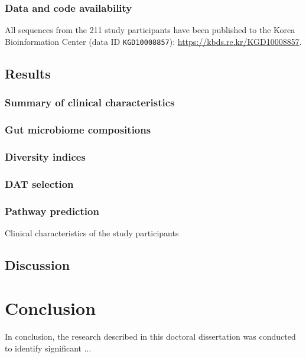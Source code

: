\documentclass[11pt, a4paper, onecolumn, oneside]{report}
\begin{document}
            \subsubsection{Data and code availability}
                All sequences from the 211 study participants have been published to the Korea Bioinformation Center (data ID \texttt{KGD10008857}): \url{https://kbds.re.kr/KGD10008857}.
        \clearpage

        \subsection{Results}
            \subsubsection{Summary of clinical characteristics}
            \subsubsection{Gut microbiome compositions}
            \subsubsection{Diversity indices}
            \subsubsection{DAT selection}
            \subsubsection{Pathway prediction}

            \begin{table}[p]
                \caption{Clinical characteristics of the study participants}
                \label{tab:CRC-clinical}
            \end{table}
            \clearpage
        \clearpage

        \subsection{Discussion}
        \clearpage
    \newpage

    \section{Conclusion}
        \label{section:conclusion}
        In conclusion, the research described in this doctoral dissertation was conducted to identify significant ...
\end{document}
